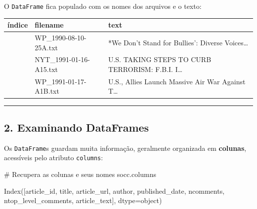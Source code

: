 \documentclass[
  brazilian,
  11pt,
]{article}
\newenvironment{Shaded}{\begin{snugshade}}{\end{snugshade}}
\newcommand{\CommentTok}[1]{\textcolor[rgb]{0.48,0.49,0.49}{#1}}
\newcommand{\NormalTok}[1]{\textcolor[rgb]{0.81,0.81,0.76}{#1}}
\newcounter{none} %
\let\oldtexttt\texttt
\renewcommand{\texttt}[1]{{\color{inlink}\oldtexttt{#1}}}
\begin{document}
O \texttt{DataFrame} fica populado com os nomes dos arquivos e o texto:

{\def\LTcaptype{none} %
\begin{longtable}[]{@{}
  >{\centering\arraybackslash}p{}
  >{\raggedright\arraybackslash}p{}
  >{\raggedright\arraybackslash}p{}@{}}
\toprule\noalign{}
\begin{minipage}[b]{\linewidth}\centering
índice
\end{minipage} & \begin{minipage}[b]{\linewidth}\raggedright
filename
\end{minipage} & \begin{minipage}[b]{\linewidth}\raggedright
text
\end{minipage} \\
\midrule\noalign{}
\endhead
\bottomrule\noalign{}
\endlastfoot
0 & WP\_1990-08-10-25A.txt & *We Don't Stand for Bullies': Diverse
Voices\ldots{} \\
1 & NYT\_1991-01-16-A15.txt & U.S. TAKING STEPS TO CURB TERRORISM:
F.B.I. I\ldots{} \\
2 & WP\_1991-01-17-A1B.txt & U.S., Allies Launch Massive Air War Against
T\ldots{} \\
\end{longtable}
}

\begin{center}\rule{0.5\linewidth}{0.5pt}\end{center}

\subsection{2. Examinando DataFrames}\label{examinando-dataframes}

Os \texttt{DataFrame}s guardam muita informação, geralmente organizada
em \textbf{colunas}, acessíveis pelo atributo \texttt{columns}:

\begin{Shaded}
\begin{Highlighting}[]
\CommentTok{\# Recupera as colunas e seus nomes}
\NormalTok{socc.columns}
\end{Highlighting}
\end{Shaded}

\begin{Shaded}
\begin{Highlighting}[]
\NormalTok{Index([\textquotesingle{}article\_id\textquotesingle{}, \textquotesingle{}title\textquotesingle{}, \textquotesingle{}article\_url\textquotesingle{}, \textquotesingle{}author\textquotesingle{}, \textquotesingle{}published\_date\textquotesingle{},}
\NormalTok{       \textquotesingle{}ncomments\textquotesingle{}, \textquotesingle{}ntop\_level\_comments\textquotesingle{}, \textquotesingle{}article\_text\textquotesingle{}],}
\NormalTok{      dtype=\textquotesingle{}object\textquotesingle{})}
\end{Highlighting}
\end{Shaded}
\end{document}
